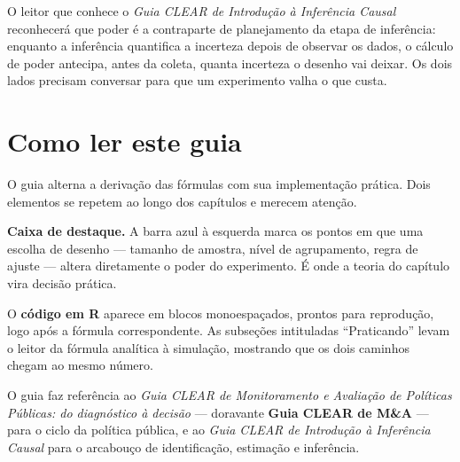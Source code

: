 \documentclass[12pt, a4paper, openany]{book}
\numberwithin{equation}{chapter}
\numberwithin{table}{chapter}
\numberwithin{figure}{chapter}
\begin{document}
O leitor que conhece o \textit{Guia CLEAR de Introdu\c{c}\~ao \`a Infer\^encia Causal}
reconhecer\'a que poder \'e a contraparte de planejamento da etapa de infer\^encia:
enquanto a infer\^encia quantifica a incerteza depois de observar os dados, o
c\'alculo de poder antecipa, antes da coleta, quanta incerteza o desenho vai
deixar. Os dois lados precisam conversar para que um experimento valha o que
custa.
\newpage

\thispagestyle{empty}
\section*{Como ler este guia}
O guia alterna a deriva\c{c}\~ao das f\'ormulas com sua implementa\c{c}\~ao pr\'atica.
Dois elementos se repetem ao longo dos cap\'itulos e merecem aten\c{c}\~ao.

\vspace{0.2cm}
\begin{boxH}
\textbf{Caixa de destaque.} A barra azul \`a esquerda marca os pontos em que uma
escolha de desenho --- tamanho de amostra, n\'ivel de agrupamento, regra de
ajuste --- altera diretamente o poder do experimento. \'E onde a teoria do
cap\'itulo vira decis\~ao pr\'atica.
\end{boxH}
\vspace{0.3cm}

\noindent O \textbf{c\'odigo em R} aparece em blocos monoespa\c{c}ados, prontos para
reprodu\c{c}\~ao, logo ap\'os a f\'ormula correspondente. As subse\c{c}\~oes intituladas
``Praticando'' levam o leitor da f\'ormula anal\'itica \`a simula\c{c}\~ao, mostrando
que os dois caminhos chegam ao mesmo n\'umero.

\vspace{0.3cm}
\noindent O guia faz refer\^encia ao \textit{Guia CLEAR de Monitoramento e
Avalia\c{c}\~ao de Pol\'iticas P\'ublicas: do diagn\'ostico \`a decis\~ao} ---
doravante \textbf{Guia CLEAR de M\&A} --- para o ciclo da pol\'itica p\'ublica, e ao
\textit{Guia CLEAR de Introdu\c{c}\~ao \`a Infer\^encia Causal} para o arcabou\c{c}o de
identifica\c{c}\~ao, estima\c{c}\~ao e infer\^encia.
\newpage

\tableofcontents
\newpage

\end{document}
